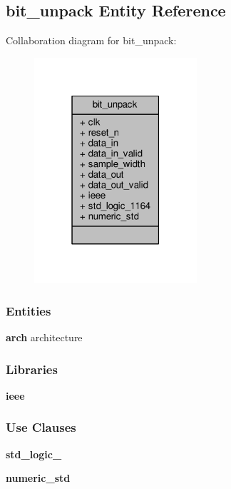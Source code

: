 \subsection{bit\+\_\+unpack Entity Reference}
\label{classbit__unpack}


Collaboration diagram for bit\+\_\+unpack\+:\nopagebreak
\begin{figure}[H]
\begin{center}
\leavevmode
\includegraphics[width=171pt]{d4/d79/classbit__unpack__coll__graph}
\end{center}
\end{figure}
\subsubsection*{Entities}
\begin{DoxyCompactItemize}
\item 
{\bf arch} architecture
\end{DoxyCompactItemize}
\subsubsection*{Libraries}
 \begin{DoxyCompactItemize}
\item 
{\bf ieee} 
\end{DoxyCompactItemize}
\subsubsection*{Use Clauses}
 \begin{DoxyCompactItemize}
\item 
{\bf std\+\_\+logic\+\_}   
\item 
{\bf numeric\+\_\+std}   
\end{DoxyCompactItemize}

